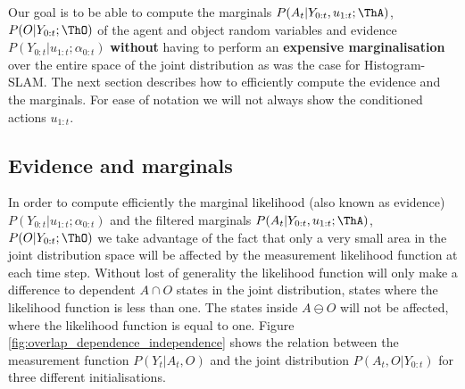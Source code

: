 Our goal is to be able to compute the marginals $P(A_t|Y_{0:t},u_{1:t};\ThA)$, $P(O|Y_{0:t};\ThO)$ of the agent and object random variables and 
evidence $P(Y_{0:t}|u_{1:t};\alpha_{0:t})$ \textbf{without} having to perform an \textbf{expensive marginalisation} over the entire space of the joint distribution 
as was the case for Histogram-SLAM.  The next section describes how to efficiently compute the evidence and the marginals.
For ease of notation we will not always show the conditioned actions $u_{1:t}$.

\subsection{Evidence and marginals}

In order to compute efficiently the marginal likelihood (also known as evidence) $P(Y_{0:t}|u_{1:t};\alpha_{0:t})$ and the filtered  marginals $P(A_t|Y_{0:t},u_{1:t};\ThA)$,
$P(O|Y_{0:t};\ThO)$ we take advantage of the fact that only a very small area 
in the joint distribution space will be affected by the measurement likelihood function at each time step.
Without lost of generality the likelihood function will only make a difference to dependent $A \cap O$ states in the joint distribution, states 
where the likelihood function is less than one. The states inside $A \ominus O$ will not be affected, where the likelihood function 
is equal to one.
Figure \ref{fig:overlap_dependence_independence} shows the relation between the measurement 
function $P(Y_t|A_t,O)$ and the joint distribution $P(A_t,O|Y_{0:t})$ for three different initialisations. 
 
